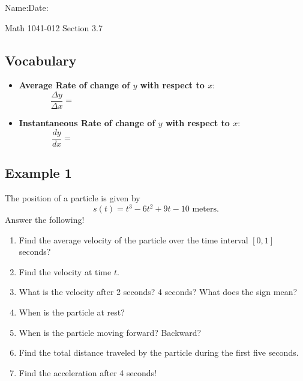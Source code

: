 \documentclass[10pt]{book}
\theoremstyle{definition}
\begin{document}
\begin{flushleft}
Name:\underline{\hspace{13cm}}Date:\underline{\hspace{2cm}}
\end{flushleft}
\begin{center}
{\Large Math 1041-012 \hspace{0.5cm} Section 3.7}
\end{center}

\begin{tcolorbox}
\subsection*{Vocabulary}
\begin{itemize}
    \item \textbf{Average Rate of change of $y$ with respect to $x$}:
    \[
    \frac{\Delta y}{\Delta x}=\hspace{4in}
    \]
    \item \textbf{Instantaneous Rate of change of $y$ with respect to $x$}:
    \[
    \frac{dy}{dx}=\hspace{4in}
    \]
\end{itemize}
\end{tcolorbox}
\subsection*{Example 1} The position of a particle is given by
\[
s(t)=t^3-6t^2+9t-10\textrm{ meters.}
\]
Answer the following!
\begin{enumerate}[label=(\alph*)]
    \item Find the average velocity of the particle over the time interval $[0,1]$ seconds? \vspace{2cm}
    \item Find the velocity at time $t$.\vspace{1cm}
    \item What is the velocity after 2 seconds? 4 seconds? What does the sign mean?\vspace{2cm}
    \item When is the particle at rest?\vspace{2cm}
    \clearpage
    \item When is the particle moving forward? Backward?\vspace{4cm}
    \item Find the total distance traveled by the particle during the first five seconds.\vspace{3cm}
    \item Find the acceleration after 4 seconds!\vspace{1cm}
\end{enumerate}
\end{document}

